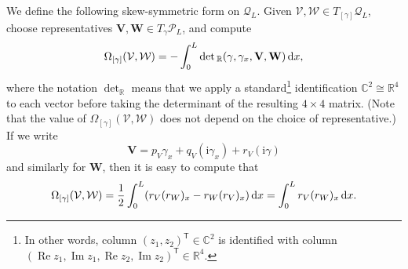\documentclass[10pt,a4paper]{amsart}
\newcommand\Leg{ {\mathcal P}} %
\newcommand\Legq{\mathcal Q}
\def\ri{\mathrm{i}}
\newcommand\VV{\mathbf V}
\newcommand\VW{\mathbf W}
\newcommand\qV{\mathcal V}%
\newcommand\qW{\mathcal W}
\newcommand{\dx}{\,{\rm d}x}
\def\gam{\gamma} %
\def\C{\mathbb C}
\def\R{\mathbb R}
\renewcommand\Re{\operatorname{Re}}
\renewcommand\Im{\operatorname{Im}}
\numberwithin{equation}{section}
\begin{document}
We define the following skew-symmetric form on $\Legq_L$. Given $\qV, \qW \in T_{[\gamma]}\Legq_L$, choose
representatives $\VV,\VW \in T_\gamma \Leg_L$, and compute
\begin{equation}\label{our2form}
\Omega_{[\gamma]} (\qV, \qW)
= -\int_0^L \det{}_\R( \gam, \gam_x, \VV, \VW)\dx,
\end{equation}
where the notation $\det_\R$ means that we apply a standard\footnote{%
In other words, column $(z_1, z_2)^{\mathsf{T}} \in \C^2$ is identified with column $(\Re z_1, \Im z_1, \Re z_2, \Im z_2)^{\mathsf{T}}\in \R^4$.}
identification $\C^2 \cong \R^4$ to each vector before taking the determinant of the resulting $4\times 4$ matrix.
(Note that the value of $\Omega_{[\gamma]}(\qV, \qW)$
does not depend on the choice of representative.)
If we write
\[\VV = p_V\gam_x + q_V (\ri\gam_x) + r_V (\ri \gam)\]
and similarly for $\VW$, then it is easy to compute that
\[\Omega_{[\gamma]}(\qV, \qW) = \frac12\int_0^L (r_V (r_W)_x - r_W (r_V)_x) \dx = \int_0^L r_V (r_W)_x \dx.\]
\end{document}
